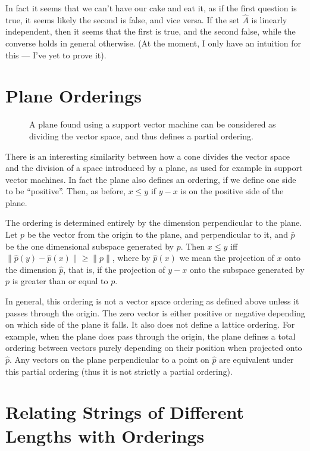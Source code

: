 \documentclass{article}
\begin{document}
In fact it seems that we can't have our cake and eat it, as if the
first question is true, it seems likely the second is false, and vice
versa. If the set $\hat{A}$ is linearly independent, then it seems
that the first is true, and the second false, while the converse holds
in general otherwise. (At the moment, I only have an intuition for
this --- I've yet to prove it).


\section{Plane Orderings}

\begin{figure}
\begin{center}

\end{center}
\caption{A plane found using a support vector machine can be
  considered as dividing the vector space, and thus defines a partial
  ordering.}
\end{figure}

There is an interesting similarity between how a cone divides the
vector space and the division of a space introduced by a plane, as
used for example in support vector machines. In fact the plane also
defines an ordering, if we define one side to be ``positive''. Then,
as before, $x \le y$ if $y - x$ is on the positive side of the plane.

The ordering is determined entirely by the dimension perpendicular to
the plane. Let $p$ be the vector from the origin to the plane, and
perpendicular to it, and $\bar{p}$ be the one dimensional subspace
generated by $p$. Then $x \le y$ iff $\|\hat{p}(y) - \hat{p}(x)\| \ge
\|p\|$, where by $\hat{p}(x)$ we mean the projection of $x$ onto the
dimension $\hat{p}$, that is, if the projection of $y - x$ onto the
subspace generated by $p$ is greater than or equal to $p$.

In general, this ordering is not a vector space ordering as defined
above unless it passes through the origin. The zero vector is either
positive or negative depending on which side of the plane it
falls. It also does not define a lattice ordering. For example, when
the plane does pass through the origin, the plane defines a total
ordering between vectors purely depending on their position when
projected onto $\hat{p}$. Any vectors on the plane perpendicular to a
point on $\hat{p}$ are equivalent under this partial ordering (thus it
is not strictly a partial ordering).

\section{Relating Strings of Different Lengths with Orderings}
\end{document}
